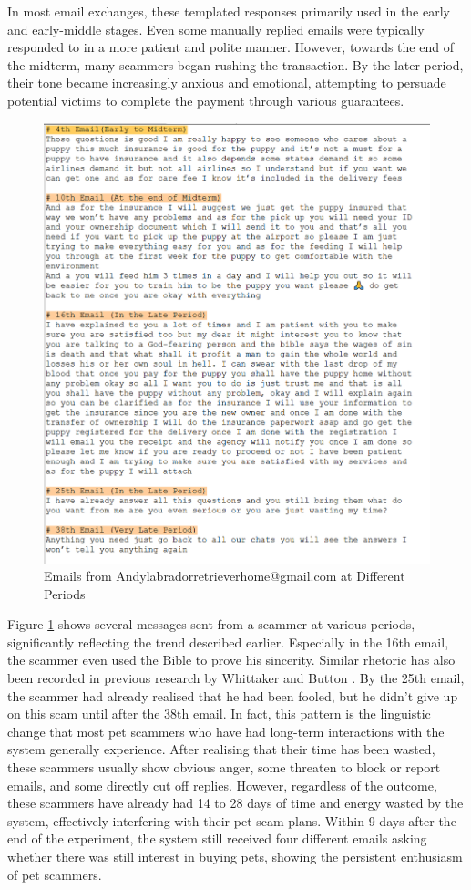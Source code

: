 \documentclass[ oneside,%
                    author={Cassie Qing Tang},
                    degree={BSc},
                     title={An Automated Response System for Disrupting Online Pet Scamming \\ },
                    subtitle={ }]{dissertation}
\begin{document}
In most email exchanges, these templated responses primarily used in the early and early-middle stages. Even some manually replied emails were typically responded to in a more patient and polite manner. However, towards the end of the midterm, many scammers began rushing the transaction. By the later period, their tone became increasingly anxious and emotional, attempting to persuade potential victims to complete the payment through various guarantees.
\begin{figure}[H]
\centering
\includegraphics[width=0.6\linewidth]{pic/figure15.png}
\caption{Emails from Andylabradorretrieverhome@gmail.com at Different Periods}
\label{fig:pic15}
\end{figure}
Figure \ref{fig:pic15} shows several messages sent from a scammer at various periods, significantly reflecting the trend described earlier. Especially in the 16th email, the scammer even used the Bible to prove his sincerity. Similar rhetoric has also been recorded in previous research by Whittaker and Button \cite{whittaker_understanding_2020}. By the 25th email, the scammer had already realised that he had been fooled, but he didn't give up on this scam until after the 38th email. In fact, this pattern is the linguistic change that most pet scammers who have had long-term interactions with the system generally experience. After realising that their time has been wasted, these scammers usually show obvious anger, some threaten to block or report emails, and some directly cut off replies. However, regardless of the outcome, these scammers have already had 14 to 28 days of time and energy wasted by the system, effectively interfering with their pet scam plans. Within 9 days after the end of the experiment, the system still received four different emails asking whether there was still interest in buying pets, showing the persistent enthusiasm of pet scammers.
\end{document}
